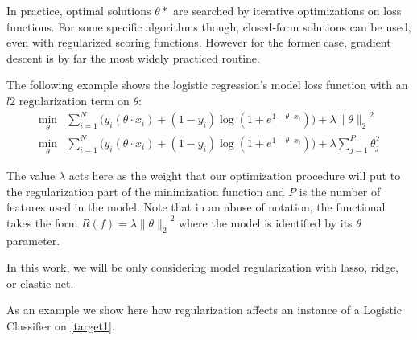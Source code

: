 In practice, optimal solutions $\theta*$ are searched by iterative optimizations on loss functions.
For some specific algorithms though, closed-form solutions can be used, even with regularized scoring functions.
However for the former case, gradient descent is by far the most widely practiced routine.

The following example shows the logistic regression's model loss function with an $l2$ regularization term on $\theta$:
\begin{equation}
\begin{split}
\min_{\theta} & \sum_{i=1}^N \big(y_i ( \theta \cdot x_i ) + (1- y_i)\log(1 + e^{1- \theta \cdot x_i} ) \big) + \lambda { \| \theta \|_{2}}^2 \\
\min_{\theta} & \sum_{i=1}^N \big(y_i ( \theta \cdot x_i ) + (1- y_i)\log(1 + e^{1- \theta \cdot x_i} ) \big) + \lambda \sum_{j=1}^P \theta_j^2
\end{split}
\label{eq:logitRegularization}
\end{equation}




The value $\lambda$ acts here as the weight that our optimization procedure will put to the regularization part of the minimization function and $P$ is the number of features used in the model.
Note that in an abuse of notation, the functional takes the form $R(f) = \lambda { \| \theta \|_{2}}^2$ where the model is identified by its $\theta$ parameter.

In this work, we will be only considering model regularization with lasso, ridge, or elastic-net.

As an example we show here how regularization affects an instance of a Logistic Classifier on \cref{target1}.



